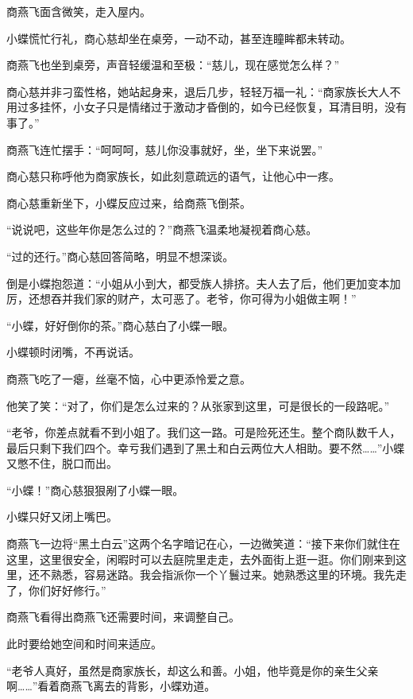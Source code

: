 
\begin{this_body}

商燕飞面含微笑，走入屋内。

小蝶慌忙行礼，商心慈却坐在桌旁，一动不动，甚至连瞳眸都未转动。

商燕飞也坐到桌旁，声音轻缓温和至极：“慈儿，现在感觉怎么样？”

商心慈并非刁蛮性格，她站起身来，退后几步，轻轻万福一礼：“商家族长大人不用过多挂怀，小女子只是情绪过于激动才昏倒的，如今已经恢复，耳清目明，没有事了。”

商燕飞连忙摆手：“呵呵呵，慈儿你没事就好，坐，坐下来说罢。”

商心慈只称呼他为商家族长，如此刻意疏远的语气，让他心中一疼。

商心慈重新坐下，小蝶反应过来，给商燕飞倒茶。

“说说吧，这些年你是怎么过的？”商燕飞温柔地凝视着商心慈。

“过的还行。”商心慈回答简略，明显不想深谈。

倒是小蝶抱怨道：“小姐从小到大，都受族人排挤。夫人去了后，他们更加变本加厉，还想吞并我们家的财产，太可恶了。老爷，你可得为小姐做主啊！”

“小蝶，好好倒你的茶。”商心慈白了小蝶一眼。

小蝶顿时闭嘴，不再说话。

商燕飞吃了一瘪，丝毫不恼，心中更添怜爱之意。

他笑了笑：“对了，你们是怎么过来的？从张家到这里，可是很长的一段路呢。”

“老爷，你差点就看不到小姐了。我们这一路。可是险死还生。整个商队数千人，最后只剩下我们四个。幸亏我们遇到了黑土和白云两位大人相助。要不然……”小蝶又憋不住，脱口而出。

“小蝶！”商心慈狠狠剐了小蝶一眼。

小蝶只好又闭上嘴巴。

商燕飞一边将“黑土白云”这两个名字暗记在心，一边微笑道：“接下来你们就住在这里，这里很安全，闲暇时可以去庭院里走走，去外面街上逛一逛。你们刚来到这里，还不熟悉，容易迷路。我会指派你一个丫鬟过来。她熟悉这里的环境。我先走了，你们好好修行。”

商燕飞看得出商燕飞还需要时间，来调整自己。

此时要给她空间和时间来适应。

“老爷人真好，虽然是商家族长，却这么和善。小姐，他毕竟是你的亲生父亲啊……”看着商燕飞离去的背影，小蝶劝道。


\end{this_body}
